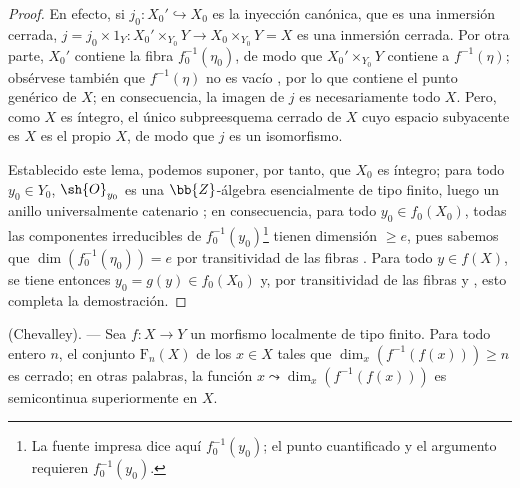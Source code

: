 \begin{proof}
En efecto, si $j_0:X_0'\hookrightarrow X_0$ es la inyección canónica, que es una inmersión cerrada, $j=j_0\times 1_Y:X_0'\times_{Y_0}Y\to X_0\times_{Y_0}Y=X$ es una inmersión cerrada.
Por otra parte, $X_0'$ contiene la fibra $f_0^{-1}(\eta_0)$, de modo que $X_0'\times_{Y_0}Y$ contiene a $f^{-1}(\eta)$; obsérvese también que $f^{-1}(\eta)$ no es vacío , por lo que contiene el punto genérico de $X$; en consecuencia, la imagen de $j$ es necesariamente todo $X$.
Pero, como $X$ es íntegro, el único subpreesquema cerrado de $X$ cuyo espacio subyacente es $X$ es el propio $X$, de modo que $j$ es un isomorfismo.

Establecido este lema, podemos suponer, por tanto, que $X_0$ es íntegro; para todo $y_0\in Y_0$, $\sh{O}_{y_0}$ es una $\bb{Z}$-álgebra esencialmente de tipo finito, luego un anillo universalmente
catenario ; en consecuencia, para todo $y_0\in f_0(X_0)$, todas las componentes irreducibles de $f_0^{-1}(y_0)$\footnote{La fuente impresa dice aquí $f_0^{-1}(y_0)$; el punto cuantificado y el argumento requieren $f_0^{-1}(y_0)$.} tienen dimensión $\geq e$, pues sabemos que $\dim(f_0^{-1}(\eta_0))=e$ por transitividad de las fibras .
Para todo $y\in f(X)$, se tiene entonces $y_0=g(y)\in f_0(X_0)$ y, por transitividad de las fibras y , esto completa la demostración.
\end{proof}

\begin{theorem}[13.1.3]
\label{IV.13.1.3}
\textnormal{(Chevalley).} ---
Sea $f:X\to Y$ un morfismo localmente de tipo finito.
Para todo entero $n$, el conjunto $\mathrm{F}_n(X)$ de los $x\in X$ tales que $\dim_x(f^{-1}(f(x)))\geq n$ es cerrado; en otras palabras, la función $x\leadsto\dim_x(f^{-1}(f(x)))$ es semicontinua superiormente en $X$.
\end{theorem}

